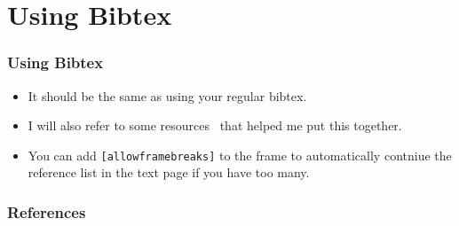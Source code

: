 \documentclass[
	11pt, %
	aspectratio=169, %
]{beamer}
\begin{document}
\section{Using Bibtex}
\begin{frame}
  \frametitle{Using Bibtex}
  \begin{itemize}
    \item It should be the same as using your regular bibtex.
    \item I will also refer to some resources~\cite{anglimAnswerImageFull2010,fiandrinoAnswerDesignCustom2013,kormyloAnswerMakeTikz2017} that helped me put this together.
    \item You can add \texttt{[allowframebreaks]} to the frame to automatically contniue the reference list in the text page if you have too many.
  \end{itemize}
\end{frame}

\begin{frame}[allowframebreaks]
  \frametitle{References}
  
  
\end{frame}
\end{document}
